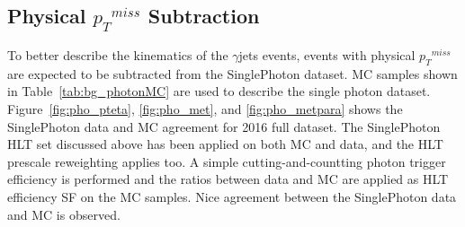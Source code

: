 \subsection{Physical ${p_{T}}^{miss}$ Subtraction}
To better describe the kinematics of the $\gamma$jets events, events with physical ${p_{T}}^{miss}$ are expected to be subtracted from the SinglePhoton dataset. MC samples shown in Table~\ref{tab:bg_photonMC} are used to describe the single photon dataset. Figure~\ref{fig:pho_pteta}, \ref{fig:pho_met}, and \ref{fig:pho_metpara} shows the SinglePhoton data and MC agreement for 2016 full dataset. The SinglePhoton HLT set discussed above has been applied on both MC and data, and the HLT prescale reweighting applies too. A simple cutting-and-countting photon trigger efficiency is performed and the ratios between data and MC are applied as HLT efficiency SF on the MC samples. Nice agreement between the SinglePhoton data and MC is observed.

